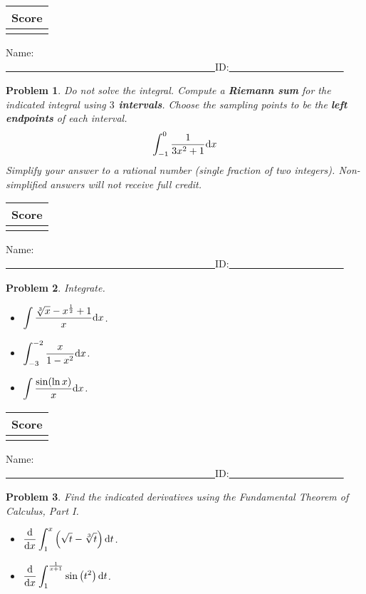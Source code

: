 \documentclass[12pt]{article}
\newtheorem{problem}{Problem}
\newcommand{\diff}{{\normalfont \text{d}}}
\newcommand{\finishUMBExamPage}{
\vfill
\hfill \begin{tabular}{|c|}\hline Score\\\hline  \\\hline \end{tabular}
}
\newcommand{\startUMBExamPage}{\newpage
\noindent Name: \underline{~~~~~~~~~~~~~~~~~~~~~~~~~~~~~~~~~~~~~~~~~~}\hfill ID:\underline{~~~~~~~~~~~~~~~~~~~~~~~}}
\begin{document}
\finishUMBExamPage
\startUMBExamPage
\begin{problem}
{\sc Do not solve the integral. } Compute a \textbf{Riemann sum} for the indicated integral using \textbf{$3$ intervals}. Choose the sampling points to be the \textbf{left endpoints} of each interval. 
\[
\int_{-1}^0\frac{1}{3 {{x}}^{2}+1}\diff x
\]
Simplify your answer to a rational number (single fraction of two integers). {\sc Non-simplified answers will not receive full credit.}

\vfill
\vfill
\end{problem}
\finishUMBExamPage
\startUMBExamPage
\begin{problem}
Integrate.
\begin{itemize}
\item $\displaystyle\int \frac{\sqrt[3]{x}-x^{\frac{1}{2}}+1 }{x}\diff x$.
\vskip 5cm
\item $\displaystyle\int_{-3}^{-2} \frac{x}{1-x^2}\diff x$.
\vskip 5cm
\item $\displaystyle\int \frac{\sin (\ln x)}{x} \diff x$.
\end{itemize}
\end{problem}
\finishUMBExamPage
\startUMBExamPage
\begin{problem}
Find the indicated derivatives using the Fundamental Theorem of Calculus, Part I.
\begin{itemize}
\item $\displaystyle \frac{\diff}{\diff x}\int_{1}^x\left(\sqrt{t}-\sqrt[3]{t}\right)\diff t$.

\vskip 8cm
\item $\displaystyle \frac{\diff}{\diff x}\int_{1}^{\frac{1}{x+1} }\sin \left(  t^2\right) \diff t$.
\end{itemize}
\end{problem}
\end{document}

